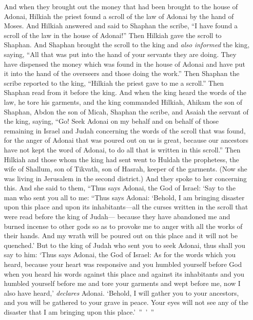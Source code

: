 \begin{biblechapter}
\verse And when they brought out the money that had been brought to the house of Adonai, Hilkiah the priest found a scroll of the law of Adonai by the hand of Moses.
\verse And Hilkiah answered and said to Shaphan the scribe, “I have found a scroll of the law in the house of Adonai!” Then Hilkiah gave the scroll to Shaphan.
\verse And Shaphan brought the scroll to the king and \textit{also informed} the king, saying, “All that was put into the hand of your servants they are doing.
\verse They have dispensed the money which was found in the house of Adonai and have put it into the hand of the overseers and those doing the work.”
\verse Then Shaphan the scribe reported to the king, “Hilkiah the priest gave to me a scroll.” Then Shaphan read from it before the king.
\verse And when the king heard the words of the law, he tore his garments,
\verse and the king commanded Hilkiah, Ahikam the son of Shaphan, Abdon the son of Micah, Shaphan the scribe, and Asaiah the servant of the king, saying,
\verse “Go! Seek Adonai on my behalf and on behalf of those remaining in Israel and Judah concerning the words of the scroll that was found, for the anger of Adonai that was poured out on us is great, because our ancestors have not kept the word of Adonai, to do all that is written in this scroll.”
\verse Then Hilkiah and those whom the king had sent went to Huldah the prophetess, the wife of Shallum, son of Tikvath, son of Hasrah, keeper of the garments. (Now she was living in Jerusalem in the second district.) And they spoke to her concerning this.
\verse And she said to them, “Thus says Adonai, the God of Israel: ‘Say to the man who sent you all to me:
\verse “Thus says Adonai: ‘Behold, I am bringing disaster upon this place and upon its inhabitants—all the curses written in the scroll that were read before the king of Judah—
\verse because they have abandoned me and burned incense to other gods so as to provoke me to anger with all the works of their hands. And my wrath will be poured out on this place and it will not be quenched.’
\verse But to the king of Judah who sent you to seek Adonai, thus shall you say to him: ‘Thus says Adonai, the God of Israel: As for the words which you heard,
\verse because your heart was responsive and you humbled yourself before God when you heard his words against this place and against its inhabitants and you humbled yourself before me and tore your garments and wept before me, now I also have heard,’ \textit{declares} Adonai.
\verse ‘Behold, I will gather you to your ancestors, and you will be gathered to your grave in peace. Your eyes will not see any of the disaster that I am bringing upon this place.’ ” ’ ”

\end{biblechapter}
